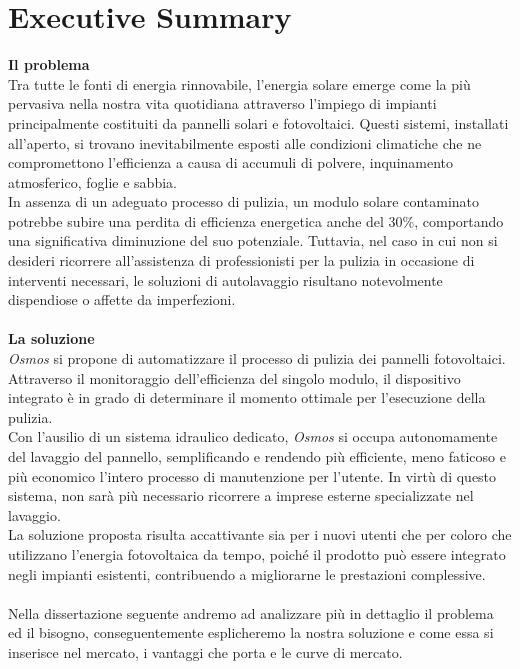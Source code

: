 \documentclass[a4paper, 12pt]{article}
\begin{document}
	\section{Executive Summary} %
	\textbf{Il problema}\\
	Tra tutte le fonti di energia rinnovabile, l’energia solare emerge come la più pervasiva nella nostra vita quotidiana attraverso l’impiego di impianti principalmente costituiti da pannelli solari e fotovoltaici. Questi sistemi, installati all'aperto, si trovano inevitabilmente esposti alle condizioni climatiche che ne compromettono l’efficienza a causa di accumuli di polvere, inquinamento atmosferico, foglie e sabbia.\\
	In assenza di un adeguato processo di pulizia, un modulo solare contaminato potrebbe subire una perdita di efficienza energetica anche del 30\%, comportando una significativa diminuzione del suo potenziale. Tuttavia, nel caso in cui non si desideri ricorrere all'assistenza di professionisti per la pulizia in occasione di interventi necessari, le soluzioni di autolavaggio risultano notevolmente dispendiose o affette da imperfezioni.\\\\
	\textbf{La soluzione}\\
	\emph{Osmos} si propone di automatizzare il processo di pulizia dei pannelli fotovoltaici. Attraverso il
	monitoraggio dell'efficienza del singolo modulo, il dispositivo integrato è in grado di determinare il momento ottimale per l’esecuzione della pulizia.\\
	Con l’ausilio di un sistema idraulico dedicato, \emph{Osmos} si occupa autonomamente del lavaggio del pannello, semplificando e rendendo più efficiente, meno faticoso e più economico l’intero processo di manutenzione per l’utente. In virtù di questo sistema, non sarà più necessario ricorrere
	a imprese esterne specializzate nel lavaggio.\\
	La soluzione proposta risulta accattivante sia per i nuovi utenti che per coloro che utilizzano l’energia fotovoltaica da tempo, poiché il prodotto può essere integrato negli impianti esistenti, contribuendo a migliorarne le prestazioni complessive.\\\\
	Nella dissertazione seguente andremo ad analizzare più in dettaglio il problema ed il bisogno, conseguentemente esplicheremo la nostra soluzione e come essa si inserisce nel mercato, i vantaggi che porta e le curve di mercato.\\\\
\end{document}
